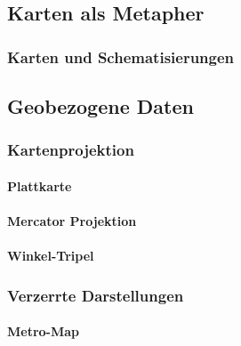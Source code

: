         \subsection{Karten als Metapher} %

            \subsubsection{Karten und Schematisierungen} %

        \subsection{Geobezogene Daten} %

            \subsubsection{Kartenprojektion} %

                \paragraph{Plattkarte} %

                \paragraph{Mercator Projektion} %

                \paragraph{Winkel-Tripel} %

            \subsubsection{Verzerrte Darstellungen} %

                \paragraph{Metro-Map} %

